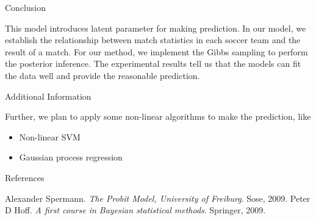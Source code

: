 \documentclass[final]{beamer}
\newlength{\onecolwid}
\begin{document}
\begin{frame}[t]
\begin{columns}[t]
\begin{column}{\onecolwid}

\begin{block}{Conclusion}

This model introduces latent parameter for making prediction. In our model, we establish the relationship between match statistics in each soccer team and the result of a match. For our method, we implement the Gibbs sampling to perform the posterior inference. The experimental results tell us that the models can fit the data well and provide the reasonable prediction.

\end{block}


\begin{block}{Additional Information}

Further, we plan to apply some non-linear algorithms to make the prediction, like 
\begin{itemize}
\item Non-linear SVM
\item Gaussian process regression
\end{itemize}

\end{block}


\begin{block}{References}
\begin{thebibliography}{99}
 Alexander Spermann. \textit{The Probit Model, University of Freiburg}. Sose, 2009.
 Peter D Hoff. \textit{A first course in Bayesian statistical methods}. Springer, 2009.
\end{thebibliography}
\end{block}



\end{column}
\end{columns}
\end{frame}
\end{document}
